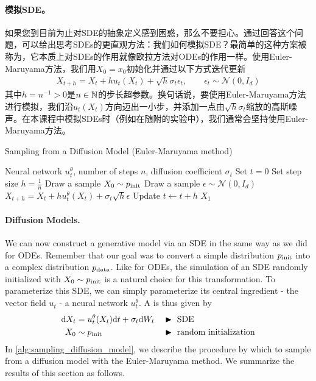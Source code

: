 \paragraph{模拟SDE。} 如果您到目前为止对SDE的抽象定义感到困惑，那么不要担心。通过回答这个问题，可以给出思考SDEs的更直观方法：我们如何模拟SDE？最简单的这种方案被称为，它本质上对SDEs的作用就像欧拉方法对ODEs的作用一样。使用Euler-Maruyama方法，我们用$X_0=x_0$初始化并通过以下方式迭代更新
\begin{align}
    X_{t+h} = X_{t}+hu_t(X_t) + \sqrt{h}\sigma_t\epsilon_t,\quad \quad \epsilon_t \sim \mathcal{N}(0,I_d)
\end{align}
其中$h=n^{-1}>0$是$n \in \mathbb N$的步长超参数。换句话说，要使用Euler-Maruyama方法进行模拟，我们沿$u_t(X_t)$方向迈出一小步，并添加一点由$\sqrt{h}\sigma_t$缩放的高斯噪声。在本课程中模拟SDEs时（例如在随附的实验中），我们通常会坚持使用Euler-Maruyama方法。

\begin{algorithm}[h]
\caption{Sampling from a Diffusion Model (Euler-Maruyama  method)}
\label{alg:sampling_diffusion_model}
\begin{algorithmic}[1]
\REQUIRE Neural network $u_t^\theta$, number of steps $n$, diffusion coefficient $\sigma_t$
\STATE Set $t=0$
\STATE Set step size $h=\frac{1}{n}$
\STATE Draw a sample $X_0\sim p_{\rm{init}}$
    \STATE Draw a sample $\epsilon\sim \mathcal{N}(0,I_d)$
    \STATE $X_{t+h} = X_{t} + h u_t^\theta(X_t)+\sigma_t\sqrt{h}\epsilon$
    \STATE Update $t\leftarrow t+h$
\ENDFOR
\RETURN $X_1$
\end{algorithmic}
\end{algorithm}

\paragraph{Diffusion Models.} We can now construct a generative model via an SDE in the same way as we did for ODEs. Remember that our goal was to convert a simple distribution $p_{\rm{init}}$ into a complex distribution $p_{\rm{data}}$. Like for ODEs, the simulation of an SDE randomly initialized with $X_0\sim p_{\rm{init}}$ is a natural choice for this transformation. To parameterize this SDE, we can simply parameterize its central ingredient - the vector field $u_t$ - a neural network $u_t^\theta$. A  is thus given by
\begin{align*}
    \mathrm{d} X_t &= u_t^\theta(X_t)\mathrm{d} t + \sigma_t \mathrm{d} W_t &&\blacktriangleright\,\,\text{SDE}\\
    X_0 &\sim p_{\rm{init}}  &&\blacktriangleright\,\,\text{random initialization}
    \end{align*}
In \cref{alg:sampling_diffusion_model}, we describe the procedure by which to sample from a diffusion model with the Euler-Maruyama method. We summarize the results of this section as follows.

